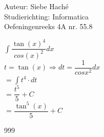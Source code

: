 \documentclass[a4paper]{article}
\begin{document}
\noindent \large Auteur: Siebe Haché \\
\noindent \large Studierichting: Informatica\\
\noindent \large Oefeningenreeks 4A nr. 55.8\\

\medskip

\normalsize

$ \displaystyle\int\dfrac{\tan(x)^4}{cos(x)^2}dx$\\

$t =\tan(x) \Rightarrow dt = \dfrac{1}{cos{x^2}}dx$\\

$ = \displaystyle\int t^4 \cdot dt$\\

$ = \dfrac{t^5}{5}+C$\\

$ = \dfrac{\tan^5(x)}{5}+C$\\
\begin{thebibliography}{999}
\end{thebibliography}
\end{document}
